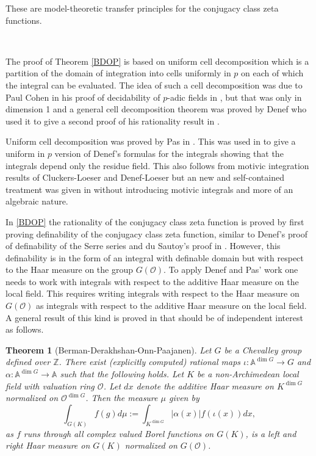 \documentclass[12pt]{amsart}
\def\Z{\mathbb{Z}}
\def\cO{\mathcal{O}}
\newtheorem{thm}{Theorem}[section]
\numberwithin{equation}{section}
\begin{document}
These are model-theoretic transfer principles for the conjugacy class zeta functions.

\

The proof of Theorem \ref{BDOP} is based on uniform cell decomposition which is a partition of the domain of integration into cells uniformly in $p$ on each of which the integral can be evaluated. The idea of such a cell decomposition was due to Paul Cohen in his proof of decidability of $p$-adic fields in \cite{Cohen}, but that was only in dimension 1 and a general cell decomposition theorem was proved by Denef who used it to give a second proof of his rationality result in \cite{Denefrationality}. 

Uniform cell decomposition was proved by Pas in \cite{pas}. This was used in \cite{BDOP} to give a uniform in $p$ version of Denef's formulas for the integrals showing that the integrals depend only the residue field. This also follows from motivic integration results of Cluckers-Loeser \cite{CL2} and Denef-Loeser \cite{DL} but an new and self-contained treatment was given in \cite{BDOP} without introducing motivic integrals and more of an algebraic nature.

In \ref{BDOP} the rationality of the conjugacy class zeta function is proved by first proving definability of the conjugacy class zeta function, similar to Denef's proof of definability of the Serre series and du Sautoy's proof in \cite{ds-conj}. However, this definability is in the form of an integral with definable domain but with respect to the Haar measure on the 
group $G(\cO)$. To apply Denef and Pas' work one needs to work with integrals with respect to the additive Haar measure on the local field. This requires writing integrals with respect to the Haar measure on $G(\cO)$ as integrals with respect to the additive Haar measure on the local field. A general result of this kind is proved in \cite{BDOP} that should be of independent interest as follows.

\begin{thm}[Berman-Derakhshan-Onn-Paajanen\label{change}] Let $G$ be a Chevalley group defined over $\Z$. There exist (explicitly computed)
rational maps $\iota: \mathbb{A}^{\dim G} \to G$ and $\alpha:
\mathbb{A}^{\dim G} \to \mathbb{A}$ such that the following holds.
Let $K$ be a non-Archimedean local field  with valuation ring
$\cO$. Let $dx$ denote the additive Haar measure on $K^{\dim G}$
normalized on $\cO^{\dim G}$. Then the measure $\mu$ given by
$$\int_{G(K)} f(g) d\mu:=\int_{K^{\dim G}} |\alpha(x)| f(\iota(x)) dx,$$
as $f$ runs through all complex valued Borel functions on $G(K)$,
is a left and right Haar measure on $G(K)$ normalized on
$G(\cO)$.
\end{thm}
\end{document}
